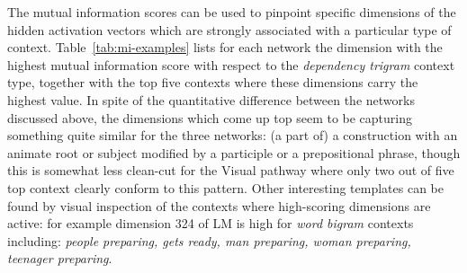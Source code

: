 The mutual information scores can be used to pinpoint specific
dimensions of the hidden activation vectors which are strongly
associated with a particular type of
context. Table~\ref{tab:mi-examples} lists for each network the
dimension with the highest mutual information score with respect to
the {\it dependency trigram} context type, together with the top
five contexts where these dimensions carry the highest value. In spite
of the quantitative difference between the networks discussed above,
the dimensions which come up top seem to be capturing something quite
similar for the three networks: (a part of) a construction with an
animate root or subject modified by a participle or a prepositional
phrase, though this is somewhat less clean-cut for the {\sc Visual}
pathway where only two out of five top context clearly conform to this
pattern.  Other interesting templates can be found by visual
inspection of the contexts where high-scoring dimensions are active:
for example dimension 324 of {\sc LM} is high for {\it word bigram} 
contexts including:
{\it people preparing, gets ready, man preparing, woman preparing,
  teenager preparing}.

